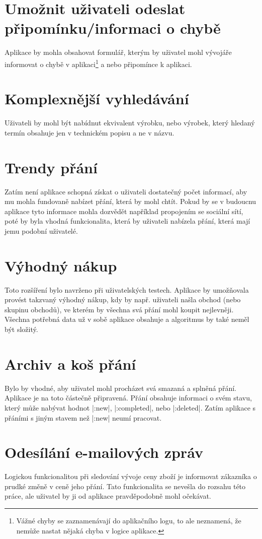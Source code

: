 \section{Umožnit uživateli odeslat připomínku/informaci o chybě}
Aplikace by mohla obsahovat formulář, kterým by uživatel mohl vývojáře informovat o chybě v aplikaci\footnote{Vážné chyby se zaznamenávají do aplikačního logu, to ale neznamená, že nemůže nastat nějaká chyba v logice aplikace.} a nebo připomínce k aplikaci.

\section{Komplexnější vyhledávání}
Uživateli by mohl být nabídnut ekvivalent výrobku, nebo výrobek, který hledaný termín obsahuje jen v technickém popisu a ne v názvu.

\section{Trendy přání}
Zatím není aplikace schopná získat o uživateli dostatečný počet informací, aby mu mohla fundovaně nabízet přání, která by mohl chtít. Pokud by se v budoucnu aplikace tyto informace mohla dozvědět například propojením se sociální sítí, poté by byla vhodná funkcionalita, která by uživateli nabízela přání, která mají jemu podobní uživatelé.

\section{Výhodný nákup}
Toto rozšíření bylo navrženo při uživatelských testech. Aplikace by umožňovala provést takzvaný výhodný nákup, kdy by např. uživateli našla obchod (nebo skupinu obchodů), ve kterém by všechna svá přání mohl koupit nejlevněji. Všechna potřebná data už v sobě aplikace obsahuje a algoritmus by také neměl být složitý.

\section{Archiv a koš přání}
Bylo by vhodné, aby uživatel mohl procházet svá smazaná a splněná přání. Aplikace je na toto částečně připravená. Přání obsahuje informaci o svém stavu, který může nabývat hodnot |:new|, |:completed|, nebo |:deleted|. Zatím aplikace s přáními s jiným stavem než |:new| neumí pracovat.

\section{Odesílání e-mailových zpráv}
Logickou funkcionalitou při sledování vývoje ceny zboží je informovat zákazníka o prudké změně v ceně jeho přání. Tato funkcionalita se nevešla do rozsahu této práce, ale uživatel by ji od aplikace pravděpodobně mohl očekávat.